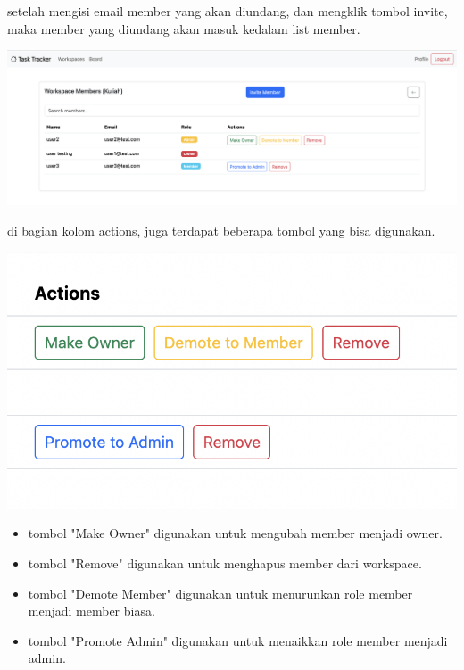 setelah mengisi email member yang akan diundang, dan mengklik tombol invite, maka member yang diundang akan masuk kedalam list member.
\begin{center}
  \includegraphics[width=1\textwidth]{assets/ui/list_member_complete_role.png}
\end{center}
di bagian kolom actions, juga terdapat beberapa tombol yang bisa digunakan.
\begin{center}
  \includegraphics[width=1\textwidth]{assets/ui/list_member_actions.png}
\end{center}
\begin{itemize}
  \item tombol "Make Owner" digunakan untuk mengubah member menjadi owner.
  \item tombol "Remove" digunakan untuk menghapus member dari workspace.
  \item tombol "Demote Member" digunakan untuk menurunkan role member menjadi member biasa.
  \item tombol "Promote Admin" digunakan untuk menaikkan role member menjadi admin.
\end{itemize}

